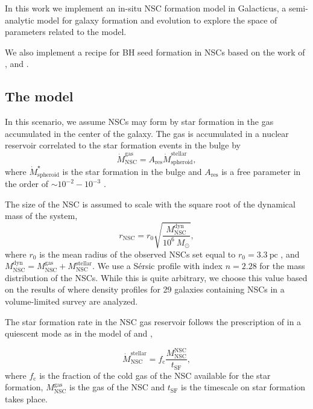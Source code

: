 \documentclass[baaa]{baaa}
\begin{document}
In this work we implement an in-situ NSC formation model in {\sc Galacticus},  a semi-analytic model for galaxy formation and evolution \citep{BENSON2012} to explore the space of parameters related to the model.  


We also implement a recipe for BH seed formation in NSCs based on the work of \cite{ESCALA2021}, and \cite{VERGARA2023}.

\subsection{The model}

In this scenario, we assume NSCs may form by star formation in the gas accumulated in the center of the galaxy. The gas is accumulated in a nuclear reservoir correlated to the star formation events in the bulge \citep{GRANATO2004,HAIMAN2004,LAPI2014,ANTONINI2015,NEUMAYER2011} by
\begin{equation}
\dot{M}_\mathrm{NSC}^\mathrm{gas} = A_\mathrm{res}\dot{M}_\mathrm{spheroid}^\mathrm{stellar},
\end{equation}
where $\dot{M}_\mathrm{spheroid}^\mathrm{\star}$ is the star formation in the bulge and $A_\mathrm{res}$ is a free parameter in the order of $\sim 10^{-2}-10^{-3}$ \citep{ANTONINI2015}.

The size of the NSC is assumed to scale with the square root of the dynamical mass of the system, 
\begin{equation}
r_\mathrm{NSC} = r_0\sqrt{\frac{M^\mathrm{dyn}_\mathrm{NSC}}{10^{6}~M_\odot}},
\end{equation}
where $r_0$ is the mean radius of the observed NSCs set equal to $r_0=3.3~\mathrm{pc}$ \citep{NEUMAYER2020}, and $M^\mathrm{dyn}_\mathrm{NSC}=M_\mathrm{NSC}^\mathrm{gas}+M_\mathrm{NSC}^\mathrm{stellar}$.
We use a S\'ersic profile with index $n=2.28$ for the mass distribution of the NSCs. While this is quite arbitrary, we choose this value based on the results of \cite{PECHETTI2020} where density profiles for 29 galaxies containing NSCs in a volume-limited survey are analyzed.

The star formation rate in the NSC gas reservoir follows the prescription of \cite{KRUMHOLZ2009} in a quiescent mode as in the model of \cite{SESANA2014} and \cite{ANTONINI2015}, 

\begin{equation}
\dot{M}_\mathrm{NSC}^\mathrm{stellar} = f_\mathrm{c} \frac{M_\mathrm{NSC}^\mathrm{NSC}}{t_\mathrm{SF}},
\end{equation}
where $f_\mathrm{c}$ is the fraction of the cold gas of the NSC available for the star formation, $M_\mathrm{NSC}^\mathrm{gas}$ is the gas of the NSC and $t_\mathrm{SF}$ is the timescale on star formation takes place.
\end{document}
